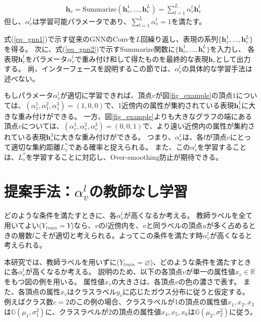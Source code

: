 \documentclass[a4j,twocolumn]{jsarticle}
\begin{document}
\begin{align}
  & \bm{h}_v   = \text{Summarize}(\bm{h}_v^1,\ldots,\bm{h}_v^L) = \sum_{l=1}^L \alpha_v^l \bm{h}_v^l \label{eq_summarize1}
\end{align}
但し、$\alpha_v^l$は学習可能パラメータであり、$\sum_{l=1}^L \alpha_v^l=1$を満たす。

式(\ref{eq_gnn1})で示す従来のGNNのConvを$L$回繰り返し、表現の系列$\{\bm{h}_v^1,\ldots,\bm{h}_v^L\}$を得る。
次に、式(\ref{eq_gnn2})で示すSummarize関数に$\{\bm{h}_v^1,\ldots,\bm{h}_v^L\}$を入力し、
各表現$\bm{h}_v^l$をパラメータ$\alpha_v^l$で重み付け和して得たものを最終的な表現$\bm{h}_v$として出力する。
尚、インターフェースを説明するこの節では、$\alpha_v^l$の具体的な学習手法は述べない。

もしパラメータ$\alpha_v^l$が適切に学習できれば、頂点$v$が図\ref{fig_example}の頂点$1$については、$(\alpha_1^1,\alpha_1^2,\alpha_1^3)=(1,0,0)$で、1近傍内の属性が集約されている表現$\bm{h}_1^1$に大きな重み付けができる。
一方、図\ref{fig_example}よりも大きなグラフの端にある頂点$v$については、$(\alpha_v^1,\alpha_v^2,\alpha_v^3)=(0,0,1)$で、より遠い近傍内の属性が集約されている表現$\bm{h}_v^3$に大きな重み付けができる。
つまり、$\alpha_v^l$は、各$l$が頂点$v$にとって適切な集約距離$L_v^*$である確率と捉えられる。
また、この$\alpha_v^l$を学習することは、$L_v^*$を学習することに対応し、Over-smoothing防止が期待できる。


\section{提案手法：$\alpha_v^l$の教師なし学習}
\label{sec_oversmoothing}

どのような条件を満たすときに、各$\alpha_v^l$が高くなるか考える。
教師ラベルを全て用いてよい($Y_{train}=Y$)なら、$v$の$l$近傍内を、$v$と同ラベルの頂点$u$が多く占めるときの層数$l$こそが適切と考えられる。よってこの条件を満たす時$\alpha_v^l$が高くなると考えられる。

本研究では、教師ラベルを用いずに($Y_{train}=\varnothing$)、どのような条件を満たすときに各$\alpha_v^l$が高くなるか考える。
説明のため、以下の各頂点$v$が単一の属性値$x_v\in \mathbb{R}$をもつ図の例を用いる。
属性値$x_v$の大きさは、各頂点$v$の色の濃さで表す。
また、各頂点の属性$x_v$はクラスラベル$y_v$に応じたガウス分布に従うと仮定する。
例えばクラス数$c=2$のこの例の場合、クラスラベルが1の頂点の属性値$x_1,x_2,x_3$は$\mathbb{G}(\mu_1, \sigma_1^2)$に、クラスラベルが2の頂点の属性値$x_4,x_5,x_6$は$\mathbb{G}(\mu_2, \sigma_2^2)$に従う。
\end{document}
